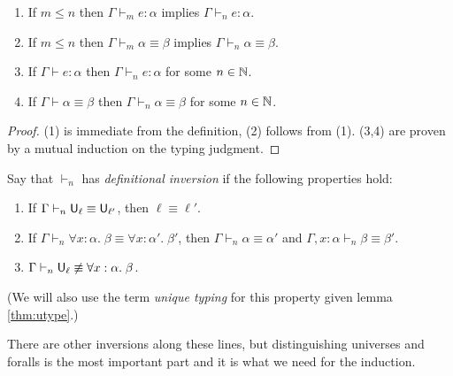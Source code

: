 \begin{lemma}
\begin{enumerate}
\item If $m\le n$ then $\Gamma\vdash_m e:\alpha$ implies $\Gamma\vdash_n e:\alpha$.
\item If $m\le n$ then $\Gamma\vdash_m\alpha\equiv\beta$ implies $\Gamma\vdash_n \alpha\equiv\beta$.
\item If $\Gamma\vdash e:\alpha$ then $\Gamma\vdash_n e:\alpha$ for some $n\in\mathbb{N}$.
\item If $\Gamma\vdash\alpha\equiv\beta$ then $\Gamma\vdash_n \alpha\equiv\beta$ for some $n\in\mathbb{N}$.
\end{enumerate}
\end{lemma}
\begin{proof}
(1) is immediate from the definition, (2) follows from (1). (3,4) are proven by a mutual induction on the typing judgment.
\end{proof}
\begin{definition}
Say that $\vdash_n$ has \emph{definitional inversion} if the following properties hold:
\begin{enumerate}
\item If $\Gamma\vdash_n \U_\ell\equiv\U_{\ell'}$, then $\ell\equiv\ell'$.
\item If $\Gamma\vdash_n \forall x:\alpha.\;\beta\equiv\forall x:\alpha'.\;\beta'$, then $\Gamma\vdash_n \alpha\equiv\alpha'$ and $\Gamma,x:\alpha\vdash_n \beta\equiv \beta'$.
\item $\Gamma\vdash_n \U_\ell\not\equiv\forall x:\alpha.\;\beta$.
\end{enumerate}
(We will also use the term \emph{unique typing} for this property given lemma \ref{thm:utype}.) 
\end{definition}
There are other inversions along these lines, but distinguishing universes and foralls is the most important part and it is what we need for the induction.

